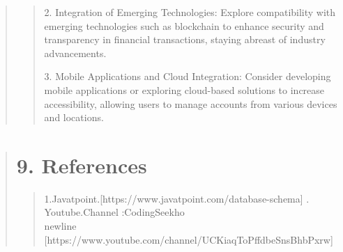 \documentclass[12pt]{report}
\begin{document}
\begin{quote}
\begin{quote}
		2. Integration of Emerging Technologies: Explore compatibility with emerging technologies such as blockchain to enhance security and transparency in financial transactions, staying abreast of industry advancements.
		
		3. Mobile Applications and Cloud Integration: Consider developing mobile applications or exploring cloud-based solutions to increase accessibility, allowing users to manage accounts from various devices and locations.
		
	
		\end{quote}
		
	\end{quote}
	\clearpage
	
	\begin{quote}
		\section{9. References}
			\justifying
		\begin{quote}
			\justifying
			1.Javatpoint.[https://www.javatpoint.com/database-schema]
			. Youtube.Channel :CodingSeekho \\newline
			[https://www.youtube.com/channel/UCKiaqToPffdbeSnsBhbPxrw]
			
		
		\end{quote}
	\end{quote}
	
\end{document}
